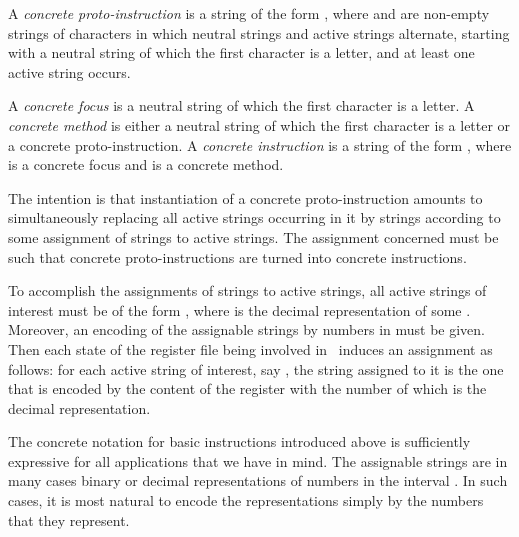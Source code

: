 \documentclass[fleqn]{llncs}
\begin{document}
A \emph{concrete proto-instruction} is a string of the form ,
where  and  are non-empty strings of characters in which neutral
strings and active strings alternate, starting with a neutral string of
which the first character is a letter, and at least one active string
occurs.

A \emph{concrete focus} is a neutral string of which the first character
is a letter.
A \emph{concrete method} is either a neutral string of which the first
character is a letter or a concrete proto-instruction.
A \emph{concrete instruction} is a string of the form , where 
is a concrete focus and  is a concrete method.

The intention is that instantiation of a concrete proto-instruction
amounts to simultaneously replacing all active strings occurring in it
by strings according to some assignment of strings to active strings.
The assignment concerned must be such that concrete proto-instructions
are turned into concrete instructions.

To accomplish the assignments of strings to active strings, all
active strings of interest must be of the form , where
 is the decimal representation of some .
Moreover, an encoding of the assignable strings by numbers in
 must be given.
Then each state of the register file being involved in \PGLDdii\ induces
an assignment as follows: for each active string of interest, say
, the string assigned to it is the one that is encoded by the
content of the register with the number of which  is the decimal
representation.

The concrete notation for basic instructions introduced above is
sufficiently expressive for all applications that we have in mind.
The assignable strings are in many cases binary or decimal
representations of numbers in the interval .
In such cases, it is most natural to encode the representations simply
by the numbers that they represent.
\end{document}

